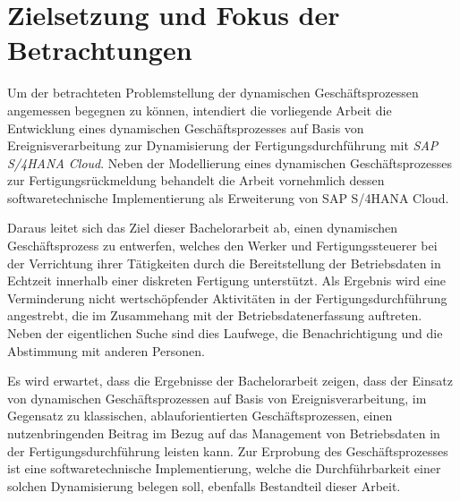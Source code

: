 \section{Zielsetzung und Fokus der Betrachtungen}\label{sec:Zielsetzung}
Um der betrachteten Problemstellung der dynamischen Geschäftsprozessen angemessen begegnen zu können, intendiert die vorliegende Arbeit die Entwicklung eines dynamischen Geschäftsprozesses auf Basis von Ereignisverarbeitung zur Dynamisierung der Fertigungsdurchführung mit \textit{SAP S/4HANA Cloud}. Neben der Modellierung eines dynamischen Geschäftsprozesses zur Fertigungsrückmeldung behandelt die Arbeit vornehmlich dessen softwaretechnische Implementierung als Erweiterung von SAP S/4HANA Cloud.

 

Daraus leitet sich das Ziel dieser Bachelorarbeit ab, einen dynamischen Geschäftsprozess zu entwerfen, welches den Werker und Fertigungssteuerer bei der Verrichtung ihrer Tätigkeiten durch die Bereitstellung der Betriebsdaten in Echtzeit innerhalb einer diskreten Fertigung unterstützt. Als Ergebnis wird eine Verminderung nicht wertschöpfender Aktivitäten in der Fertigungsdurchführung angestrebt, die im Zusammehang mit der Betriebsdatenerfassung auftreten. Neben der eigentlichen Suche sind dies Laufwege, die Benachrichtigung und die Abstimmung mit anderen Personen.

Es wird erwartet, dass die Ergebnisse der Bachelorarbeit zeigen, dass der Einsatz von dynamischen Geschäftsprozessen auf Basis von Ereignisverarbeitung, im Gegensatz zu klassischen, ablauforientierten Geschäftsprozessen, einen nutzenbringenden Beitrag im Bezug auf das Management von Betriebsdaten in der Fertigungsdurchführung leisten kann. Zur Erprobung des Geschäftsprozesses ist eine softwaretechnische Implementierung, welche die Durchführbarkeit einer solchen Dynamisierung belegen soll, ebenfalls Bestandteil dieser Arbeit.
